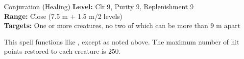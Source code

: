 {Conjuration (Healing)}
{
	\textbf{Level:}
	Clr 9, Purity 9, Replenishment 9\\
	\textbf{Range:}
	Close (7.5 m + 1.5 m/2 levels)\\
	\textbf{Targets:}
	One or more creatures, no two of which can be more than 9 m apart\\
}
{
	This spell functions like , except as noted above. The maximum number of hit points restored to each creature is 250.

}
